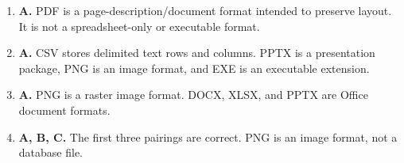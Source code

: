 \begin{enumerate}[label=\textbf{Q\arabic*.}, leftmargin=*]
\item \textbf{A.} PDF is a page-description/document format intended to preserve layout. It is not a spreadsheet-only or executable format.

\item \textbf{A.} CSV stores delimited text rows and columns. PPTX is a presentation package, PNG is an image format, and EXE is an executable extension.

\item \textbf{A.} PNG is a raster image format. DOCX, XLSX, and PPTX are Office document formats.

\item \textbf{A, B, C.} The first three pairings are correct. PNG is an image format, not a database file.

\end{enumerate}

